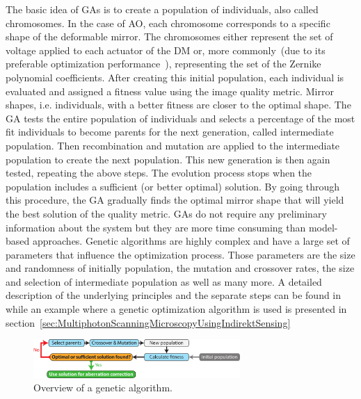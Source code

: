 The basic idea of GAs is to create a population of individuals, also called chromosomes. In the case of AO, each chromosome corresponds to a specific shape of the deformable mirror. The chromosomes either represent the set of voltage applied to each actuator of the DM or, more commonly~(due to its preferable optimization performance~\cite{Genetic_smart_algorithm}), representing the set of the Zernike polynomial coefficients. After creating this initial population, each individual is evaluated and assigned a fitness value using the image quality metric. Mirror shapes, i.e. individuals, with a better fitness are closer to the optimal shape. The GA tests the entire population of individuals and selects a percentage of the most fit individuals to become parents for the next generation, called intermediate population. Then recombination and mutation are applied to the intermediate population to create the next population. This new generation is then again tested, repeating the above steps. The evolution process stops when the population includes a sufficient (or better optimal) solution. By going through this procedure, the GA gradually finds the optimal mirror shape that will yield the best solution of the quality metric. GAs do not require any preliminary information about the system but they are more time consuming than model-based approaches. Genetic algorithms are highly complex and have a large set of parameters  that influence the optimization process. Those parameters are the size and randomness of initially population, the mutation and crossover rates, the size and selection of intermediate population as well as many more. A detailed description of the underlying principles and the separate steps can be found in~\cite{Genetic_tutorial} while an example where a genetic optimization algorithm is used is presented in section~\ref{sec:MultiphotonScanningMicroscopyUsingIndirektSensing}

\begin{figure}[htbp]
	\centering
		\includegraphics[width=0.70\textwidth]{images/genetic_algorithm_overview.pdf}
	\caption{Overview of a genetic algorithm. }
	\label{fig:genetic_algorithm_overview}
\end{figure}


